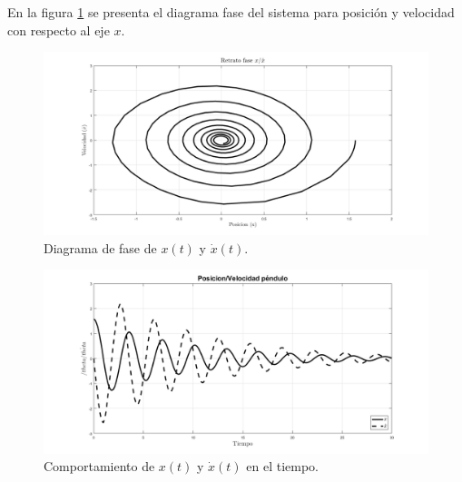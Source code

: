 En la figura \ref{fig: phase plot x} 
se presenta el diagrama fase del sistema para
posición y velocidad con respecto al eje $x$.

\begin{figure}[hb]
 \centering 
 \includegraphics[scale=0.15]{./img/fasependulox2.png}
 \caption{Diagrama de fase de $x(t)$ y $\dot{x}(t)$.}
 \label{fig: phase plot x}
\end{figure}



\begin{figure}[hb]
 \centering 
 \includegraphics[scale=0.15]{./img/posvelpendulo2.png}
 \caption{Comportamiento de $x(t)$ y $\dot{x}(t)$ en el tiempo.}
 \label{fig: time plot x dx}
\end{figure}
